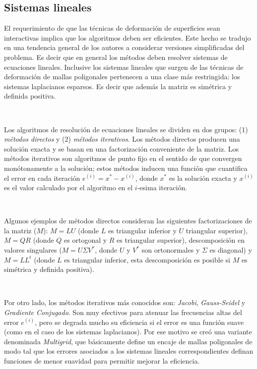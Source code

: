 \documentclass{article}
\begin{document}
\subsection{Sistemas lineales}
El requerimiento de que las técnicas de deformación de superficies sean 
interactivas implica que los algoritmos deben ser eficientes. Este hecho 
se tradujo en una tendencia general de los autores a considerar versiones 
simplificadas del problema. Es decir que en general los métodos deben resolver 
 sistemas de ecuaciones lineales. Inclusive los sistemas lineales que surgen 
de las técnicas de deformación de mallas poligonales pertenecen a una clase 
más restringida: los sistemas laplacianos esparsos. Es decir que además 
la matriz es simétrica y definida positiva.

\

Los algoritmos de resolución de ecuaciones lineales se dividen en dos grupos: 
(1) \emph{métodos directos} y (2) \emph{métodos iterativos}. Los métodos 
directos producen una solución exacta y se basan en una factorización conveniente 
de la matriz. Los métodos iterativos son algoritmos de punto fijo en 
el sentido de que convergen monótonamente a la solución; estos métodos 
inducen una función que cuantifica el error en cada iteración 
$e^{(i)} = x^* - x^{(i)}$, donde $x^*$ es la solución exacta y $x^{(i)}$ 
es el valor calculado por el algoritmo en el $i$-esima iteración.

\

Algunos ejemplos de métodos directos consideran las siguientes factorizaciones 
de la  matriz ($M$): $M=LU$ (donde $L$ es triangular inferior y $U$ triangular 
superior), $M=QR$ (donde $Q$ es ortogonal y $R$ es triangular superior), 
descomposición en valores singulares ($M = U \Sigma V^*$, donde $U$ y $V^*$ 
son ortonormales y $\Sigma$ es diagonal) y $M = LL^t$ (donde $L$ es triangular 
inferior, esta descomposición es posible si $M$ es simétrica y definida 
positiva).

\

Por otro lado, los métodos iterativos más conocidos son: \emph{Jacobi}, 
\emph{Gauss-Seidel} y \emph{Gradiente Conjugado}. Son muy efectivos para 
atenuar las frecuencias altas del error $e^{(i)}$, pero se degrada mucho 
su eficiencia si el error es una función suave (como en el caso de los sistemas 
laplacianos). Por ese motivo se creó una variante denominada \emph{Multigrid}, 
que básicamente define un encaje de mallas poligonales de modo tal que 
los errores asociados a los sistemas lineales correspondientes definan 
funciones de menor suavidad para permitir mejorar la eficiencia.
\end{document}
